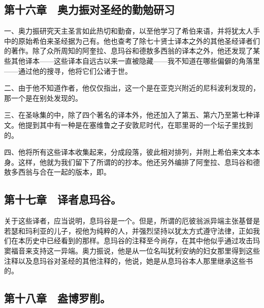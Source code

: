 \subsection{第十六章　奥力振对圣经的勤勉研习}

一、奥力振研究天主圣言如此热切和勤奋，以至他学习了希伯来语，并将犹太人手中的原始希伯来圣经据为己有。他也查考了除七十贤士译本之外的其他圣经译者们的著作。除了众所周知的阿奎拉、息玛谷和德敖多西翁的译本之外，他还发现了某些其他译本——这些译本自远古以来一直被隐藏——我不知道在哪些偏僻的角落里——通过他的搜寻，他将它们公诸于世。\par

二、由于他不知道作者，他仅仅指出，这一个是在亚克兴附近的尼科波利发现的，那一个是在别处发现的。\par

三、在圣咏集的中，除了四个著名的译本外，他还加入了第五、第六乃至第七种译文。他提到其中有一种是在塞维鲁之子安敦尼时代，在耶里哥的一个坛子里找到的。\par

四、他将所有这些译本收集起来，分成段落，彼此相对排列，并附上希伯来文本本身。这样，他就为我们留下了所谓的的抄本。他还另外编排了阿奎拉、息玛谷和德敖多西翁与合在一起的版本，即。\par


\subsection{第十七章　译者息玛谷。}

关于这些译者，应当说明，息玛谷是一个。但是，所谓的厄彼翁派异端主张基督是若瑟和玛利亚的儿子，视他为纯粹的人，并强烈坚持以犹太方式遵守法律，正如我们在本历史中已经看到的那样。息玛谷的注释至今尚存，在其中他似乎通过攻击玛窦福音来支持这一异端。奥力振说，他是从一位名叫犹利安纳的妇女那里得到这些注释以及息玛谷对圣经的其他注释的，他说，她是从息玛谷本人那里继承这些书的。\par


\subsection{第十八章　盎博罗削。}

